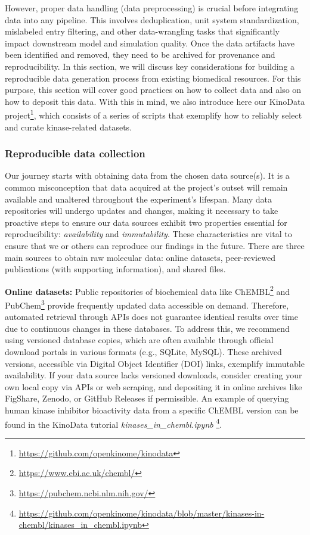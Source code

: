 \documentclass[9pt,lessons, pubversion]{livecoms}
\begin{document}
However, proper data handling (data preprocessing) is crucial before integrating data into any pipeline. 
This involves deduplication, unit system standardization, mislabeled entry filtering, and other data-wrangling tasks that significantly impact downstream model and simulation quality. 
Once the data artifacts have been identified and removed, they need to be archived for provenance and reproducibility. 
In this section, we will discuss key considerations for building a reproducible data generation process from existing biomedical resources. For this purpose, this section will cover good practices on how to collect data and also on how to deposit this data. With this in mind, we also introduce here our KinoData project\footnote{\href{https://github.com/openkinome/kinodata}{https://github.com/openkinome/kinodata}}, which consists of a series of scripts that exemplify how to reliably select and curate kinase-related datasets.


\subsubsection{Reproducible data collection}

Our journey starts with obtaining data from the chosen data source(s).
It is a common misconception that data acquired at the project's outset will remain available and unaltered throughout the experiment's lifespan. 
Many data repositories will undergo updates and changes, making it necessary to take proactive steps to ensure our data sources exhibit two properties essential for reproducibility: \textit{availability} and \textit{immutability}.
These characteristics are vital to ensure that we or others can reproduce our findings in the future. 
There are three main sources to obtain raw molecular data: online datasets, peer-reviewed publications (with supporting information), and shared files. 


\textbf{Online datasets:} 
Public repositories of biochemical data like ChEMBL\footnote{\href{https://www.ebi.ac.uk/chembl/}{https://www.ebi.ac.uk/chembl/}} and PubChem\footnote{\href{https://pubchem.ncbi.nlm.nih.gov/}{https://pubchem.ncbi.nlm.nih.gov/}} provide frequently updated data accessible on demand. 
Therefore, automated retrieval through APIs does not guarantee identical results over time due to continuous changes in these databases. 
To address this, we recommend using versioned database copies, which are often available through official download portals in various formats (e.g., SQLite, MySQL). 
These archived versions, accessible via Digital Object Identifier (DOI) links, exemplify immutable availability. 
If your data source lacks versioned downloads, consider creating your own local copy via APIs or web scraping, and depositing it in online archives like FigShare, Zenodo, or GitHub Releases if permissible. An example of querying human kinase inhibitor bioactivity data from a specific ChEMBL version can be found in the KinoData tutorial \textit{kinases\_in\_chembl.ipynb} \footnote{\href{https://github.com/openkinome/kinodata/blob/master/kinases-in-chembl/kinases_in_chembl.ipynb}{https://github.com/openkinome/kinodata/blob/master/kinases-in-chembl/kinases\_in\_chembl.ipynb}}. 
\end{document}
